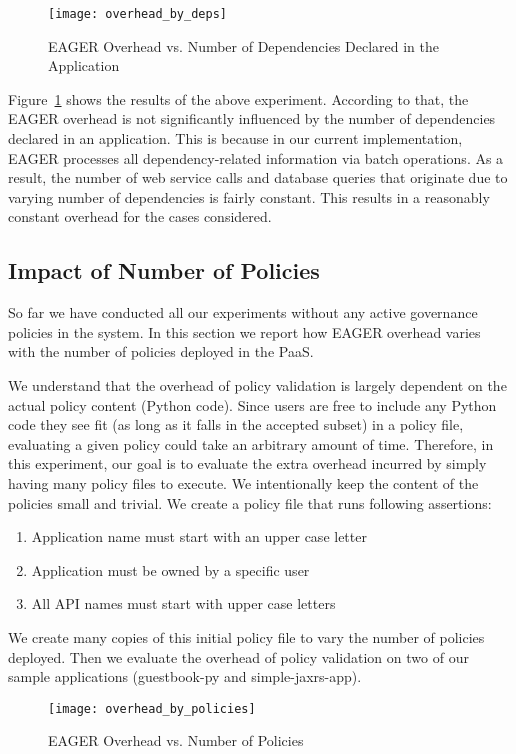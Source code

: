 \begin{figure}
\centering
\texttt{[image: overhead\_by\_deps]}
\caption{EAGER Overhead vs. Number of Dependencies Declared in the Application}
\label{fig:overhead_by_deps}
\end{figure}

Figure~\ref{fig:overhead_by_deps} shows the results of the above experiment. According to that, the EAGER overhead is not significantly
influenced by the number of dependencies declared in an application. This is because in our current implementation, EAGER processes
all dependency-related information via batch operations. 
As a result, the number of web service calls and database queries that originate due to varying number of dependencies
is fairly constant. This results in a reasonably constant overhead for the cases considered.

\subsection{Impact of Number of Policies}

So far we have conducted all our experiments without any active governance policies in the system. In this section we report how EAGER overhead
varies with the number of policies deployed in the PaaS. 

We understand that the overhead of policy validation is largely dependent
on the actual policy content (Python code). Since users are free to include any Python code they see fit (as long as it
falls in the accepted subset) in a policy file, evaluating a given policy could take an arbitrary amount of time. Therefore, in this experiment, our
goal is to evaluate the extra overhead incurred by simply having many policy files to execute. We intentionally keep the content of the policies
small and trivial. We create a policy file that runs following assertions:
\begin{enumerate}
\item Application name must start with an upper case letter
\item Application must be owned by a specific user
\item All API names must start with upper case letters
\end{enumerate}
We create many copies of this initial policy file to vary the number of policies deployed. Then we evaluate the overhead of policy validation
on two of our sample applications (guestbook-py and simple-jaxrs-app). 

\begin{figure}
\centering
\texttt{[image: overhead\_by\_policies]}
\caption{EAGER Overhead vs. Number of Policies}
\label{fig:overhead_by_policies}
\end{figure}

